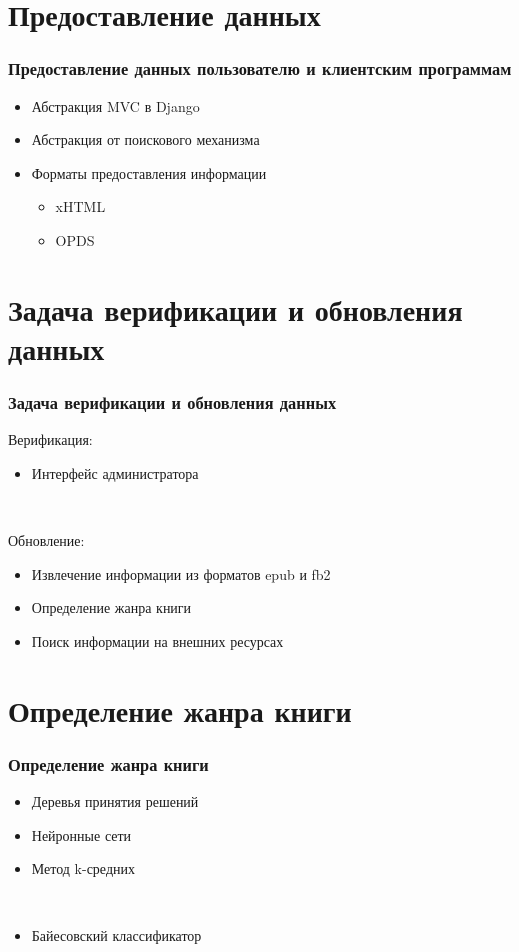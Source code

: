 \documentclass[handout]{beamer}
\begin{document}
\section{Предоставление данных}
  \begin{frame}
    \frametitle{Предоставление данных пользователю и клиентским программам}  
    
	\begin{itemize}
      \item Абстракция MVC в Django
      \item Абстракция от поискового механизма
      \item Форматы предоставления информации
          \begin{itemize}
            \item xHTML
            \item OPDS
          \end{itemize}        

    \end{itemize}        
    
  \end{frame}



\section{Задача верификации и обновления данных}
  \begin{frame}
    \frametitle{Задача верификации и обновления данных}
  
    Верификация:
    \begin{itemize}
      \item Интерфейс администратора
    \end{itemize}

    \ 
    
  	Обновление:
    \begin{itemize}
      \item Извлечение информации из форматов epub и fb2 
      \item Определение жанра книги
      \item Поиск информации на внешних ресурсах
    \end{itemize}

  \end{frame}
  

\section{Определение жанра книги}
  \begin{frame}
    \frametitle{Определение жанра книги}  
    
    \begin{itemize}
      \item Деревья принятия решений
      \item Нейронные сети
      \item Метод k-средних
		
	  \ 
		
      \item Байесовский классификатор
    \end{itemize}        
  \end{frame}
\end{document}
